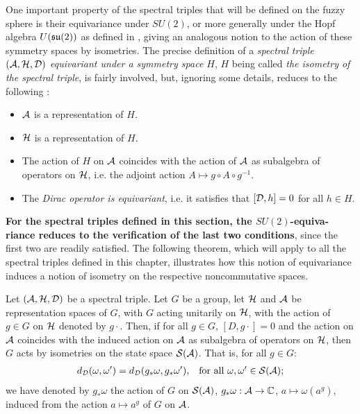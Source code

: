One important property of the spectral triples that will be defined on the fuzzy sphere is their equivariance under $SU(2)$, or more generally under the Hopf algebra $U(\mathfrak{su}(2))$ as defined in \cite{Sitarz}, giving an analogous notion to the action of these symmetry spaces by isometries. The precise definition of a \textit{spectral triple $(\mathcal A, \mathcal H, \mathcal D)$ equivariant under a symmetry space $H$}, $H$ being called \textit{the isometry of the spectral triple}, is fairly involved, but, ignoring some details, reduces to the following \cite{Sitarz}:
    \begin{itemize}
    
    \item $\mathcal A$ is a representation of $H$.
    
    \item $\mathcal H $ is a representation of $H$.
    
    \item The action of $H$ on $\mathcal A$ coincides with the action of $\mathcal A$ as subalgebra of operators on $\mathcal H$, i.e. the adjoint action $A \mapsto g \circ A \circ g^{-1}$. %
    
    \item The \textit{Dirac operator is equivariant}, i.e. it satisfies that $[\mathcal D, h] = 0$ for all $h \in H$.
    
    \end{itemize}

\textbf{For the spectral triples defined in this section, the $SU(2)$-equiva- riance reduces to the verification of the last two conditions}, since the first two are readily satisfied. The following theorem, which will apply to all the spectral triples defined in this chapter, illustrates how this notion of equivariance induces a notion of isometry on the respective noncommutative spaces.

\begin{theorem} \label{theoGInvariantDistance}
Let $(\mathcal A, \mathcal H, \mathcal D)$ be a spectral triple. Let $G$ be a group, let $\mathcal H$ and $\mathcal A$ be representation spaces of $G$, with $G$ acting unitarily on $\mathcal H$, with the action of $g \in G$ on $\mathcal H$ denoted by $g\cdot$. Then, if for all $g \in G$, $[D, g\cdot] = 0$ and the action on $\mathcal A$ coincides with the induced action on $\mathcal A$ as subalgebra of operators on $\mathcal H$, then $G$ acts by isometries on the state space $\mathcal S(\mathcal A)$. That is, for all $g \in G$:
\begin{align}
    d_\mathcal D(\omega, \omega') &= d_\mathcal D(g_* \omega, g_*\omega'), & \text{for all $\omega, \omega' \in \mathcal S(\mathcal A)$};
\end{align}
we have denoted by $g_*\omega$ the action of $G$ on $\mathcal S(\mathcal A)$, $g_* \omega: \mathcal A \to \mathbb{C}$, $a \mapsto \omega(a^g)$, induced from the action $a \mapsto a^g$ of $G$ on $\mathcal A$.
\end{theorem}


